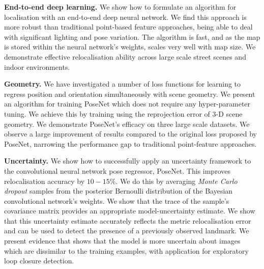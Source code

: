 \textbf{End-to-end deep learning.}
We show how to formulate an algorithm for localisation with an end-to-end deep neural network. We find this approach is more robust than traditional point-based feature approaches, being able to deal with significant lighting and pose variation. The algorithm is fast, and as the map is stored within the neural network's weights, scales very well with map size. We demonstrate effective relocalisation ability across large scale street scenes and indoor environments.

\textbf{Geometry.}
We have investigated a number of loss functions for learning to regress position and orientation simultaneously with scene geometry. We present an algorithm for training PoseNet which does not require any hyper-parameter tuning. We achieve this by training using the reprojection error of 3-D scene geometry. We demonstrate PoseNet's efficacy on three large scale datasets. We observe a large improvement of results compared to the original loss proposed by PoseNet, narrowing the performance gap to traditional point-feature approaches. 

\textbf{Uncertainty.}
We show how to successfully apply an uncertainty framework to the convolutional neural network pose regressor, PoseNet. This improves relocalisation accuracy by $10 - 15\%$. We do this by averaging \textit{Monte Carlo dropout} samples from the posterior Bernoulli distribution of the Bayesian convolutional network's weights. We show that the trace of the sample's covariance matrix provides an appropriate model-uncertainty estimate. We show that this uncertainty estimate accurately reflects the metric relocalisation error and can be used to detect the presence of a previously observed landmark. We present evidence that shows that the model is more uncertain about images which are dissimilar to the training examples, with application for exploratory loop closure detection.
